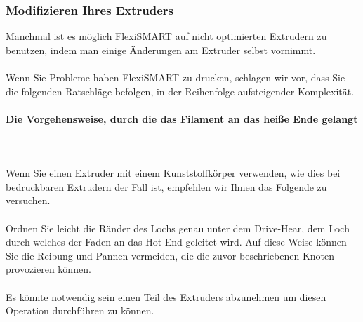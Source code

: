 \documentclass[11pt,a4paper]{article}
\begin{document}
		\subsubsection{Modifizieren Ihres Extruders}
Manchmal ist es möglich FlexiSMART auf nicht optimierten Extrudern zu benutzen, indem man einige Änderungen am Extruder selbst vornimmt.
\\\\
Wenn Sie Probleme haben FlexiSMART zu drucken, schlagen wir vor, dass Sie die folgenden Ratschläge befolgen, in der Reihenfolge aufsteigender Komplexität.
			\paragraph{Die Vorgehensweise, durch die das Filament an das heiße Ende gelangt}\mbox{}\\\\
Wenn Sie einen Extruder mit einem Kunststoffkörper verwenden, wie dies bei bedruckbaren Extrudern der Fall ist, empfehlen wir Ihnen das Folgende zu versuchen.
\\\\
Ordnen Sie leicht die Ränder des Lochs genau unter dem Drive-Hear, dem Loch durch welches der Faden an das Hot-End geleitet wird. Auf diese Weise können Sie die Reibung und Pannen vermeiden, die die zuvor beschriebenen Knoten provozieren können. 
\\\\
Es könnte notwendig sein einen Teil des Extruders abzunehmen um diesen Operation durchführen zu können.
\end{document}
